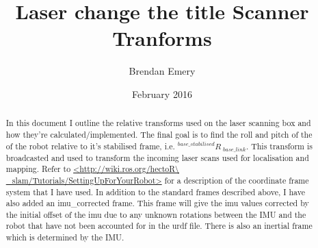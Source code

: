 \documentclass{article}
\title{Laser change the title Scanner Tranforms}
\author{Brendan Emery}
\date{February 2016}
\begin{document}
\maketitle

\begin{abstract}
\noindent In this document I outline the relative transforms used on the laser scanning box and how they're calculated/implemented. The final goal is to find the roll and pitch of the of the robot relative to it's stabilised frame, i.e. $ {^{base\_stabilised}R\ _{base\_link}} $. This transform is broadcasted and used to transform the incoming laser scans used for localisation and mapping. Refer to \url{<http://wiki.ros.org/hectoR\ _slam/Tutorials/SettingUpForYourRobot>} for a description of the coordinate frame system that I have used. In addition to the standard frames described above, I have also added an imu\_corrected frame. This frame will give the imu values corrected by the initial offset of the imu due to any unknown rotations between the IMU and the robot that have not been accounted for in the urdf file. There is also an inertial frame which is determined by the IMU.
\end{abstract}

\vspace*{1cm}

\noindent
{}
%

\vspace*{0cm}

\end{document}
